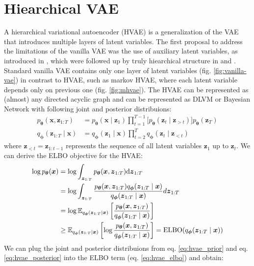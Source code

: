 \section{Hiearchical VAE}
A hierarchical variational autoencoder (HVAE) is a generalization of the VAE that introduces multiple layers of latent variables.
The first proposal to address the limitations of the vanilla VAE was the use of auxiliary latent variables, as introduced in \cite{aux-var-2016},
which were followed up by truly hiearchical structure in \cite{lvae-2016} and \cite{iaf-2016}. Standard vanilla VAE contains only one layer
of latent variables (fig. \ref{fig:vanilla-vae}) in contrast to HVAE, such as markov HVAE, where each latent variable depends only on previous one
(fig. \ref{fig:mhvae}). The HVAE can be represented as (almost) any directed acyclic graph and can be represented as DLVM or Bayesian Network with 
following joint and posterior distribuions:
\begin{align}
    p_{\boldsymbol{\theta}}(\boldsymbol{x},\boldsymbol{z}_{1:T})&=p_{\boldsymbol{\theta}}(\boldsymbol{x}\mid\boldsymbol{z}_1) \prod_{t=1}^{T-1}\bigl[p_{\boldsymbol{\theta}}(\boldsymbol{z}_{t}\mid\boldsymbol{z}_{>t}) \bigr]  p_{\boldsymbol{\theta}}(\boldsymbol{z}_{T}) \label{eq:hvae_prior} \\
    q_{\boldsymbol{\phi}}(\boldsymbol{z}_{1:T}\mid\boldsymbol{x}) &= q_{\boldsymbol{\phi}}(\boldsymbol{z}_{1}\mid\boldsymbol{x}) \prod_{t=2}^{T}  q_{\boldsymbol{\phi}}(\boldsymbol{z}_{t}\mid\boldsymbol{z}_{<t}) \label{eq:hvae_posterior}
\end{align}
where $\boldsymbol{z}_{<t} = \boldsymbol{z}_{1:t-1}$ represents the sequence of all latent variables $\boldsymbol{z}_1$ up to $\boldsymbol{z}_t$. 
We can derive the ELBO objective for the HVAE: 
\begin{align}
    \log p_{\boldsymbol{\theta}}(\boldsymbol{x}) &= \log \int_{\boldsymbol{z}_{1:T}} p_{\boldsymbol{\theta}}(\boldsymbol{x},\boldsymbol{z}_{1:T}) \mbox{\rm d}\boldsymbol{z}_{1:T} \notag\\
    &= \log \int_{\boldsymbol{z}_{1:T}} \frac{p_{\boldsymbol{\theta}}(\boldsymbol{x}, \boldsymbol{z}_{1:T})q_{\boldsymbol{\phi}}(\boldsymbol{z}_{1:T}\mid \boldsymbol{x})}{q_{\boldsymbol{\phi}}(\boldsymbol{z}_{1:T}\mid\boldsymbol{x})} d\boldsymbol{z}_{1:T} \notag \\
    &= \log \operatorname{\mathbb{E}}_{q_{\boldsymbol{\phi}}(\boldsymbol{z}_{1:T}\mid\boldsymbol{x})} \left[\frac{p_{\boldsymbol{\theta}}(\boldsymbol{x}, \boldsymbol{z}_{1:T})}{q_{\boldsymbol{\phi}}(\boldsymbol{z}_{1:T}\mid\boldsymbol{x})}\right] \notag\\
    &\geq \mathbb{E}_{q_{\boldsymbol{\phi}}(\boldsymbol{z}_{1:T}\mid\boldsymbol{x})}\left[\log \frac{p_{\boldsymbol{\theta}}(\boldsymbol{x}, \boldsymbol{z}_{1:T})}{q_{\boldsymbol{\phi}}(\boldsymbol{z}_{1:T}\mid\boldsymbol{x})}\right]  = \mathrm{ELBO}(q_{\boldsymbol{\phi}}(\boldsymbol{z}_{1:T}\mid\boldsymbol{x})) \label{eq:hvae_elbo}
\end{align}
We can plug the joint and posterior distribuions from eq. \ref{eq:hvae_prior} and  eq. \ref{eq:hvae_posterior} into the ELBO term (eq. \ref{eq:hvae_elbo}) and obtain:

